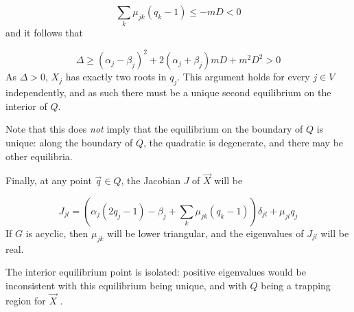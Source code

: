 \documentclass{article}
\begin{document}
\begin{equation}
    \sum_k \mu_{jk} (q_k - 1) \leq - m D < 0
\end{equation}
and it follows that

\begin{equation}
    \Delta \geq (\alpha_j - \beta_j)^2 + 2 (\alpha_j + \beta_j) m D + m^2 D^2 > 0
\end{equation}
As $\Delta > 0$, $X_j$ has exactly two roots in $q_j$. This argument holds for every
$j \in V$ independently, and as such there must be a unique second equilibrium on the
interior of $Q$.

Note that this does \emph{not} imply that the equilibrium on the boundary of $Q$
is unique: along the boundary of $Q$, the quadratic is degenerate, and there may
be other equilibria.

Finally, at any point $\vec{q} \in Q$, the Jacobian $J$ of $\vec{X}$ will be

\begin{equation}
    J_{jl} = \left(\alpha_j (2 q_j - 1) - \beta_j + \sum_k \mu_{jk} (q_k - 1)
    \right) \delta_{jl} + \mu_{jl} q_j
\end{equation}
If $G$ is acyclic, then $\mu_{jk}$ will be lower triangular, and the eigenvalues
of $J_{jl}$ will be real.

The interior equilibrium point is isolated: positive eigenvalues would be
inconsistent with this equilibrium being unique, and with $Q$ being a trapping
region for $\vec{X}$ \cite{frame2021mathematical}. 
\end{document}
